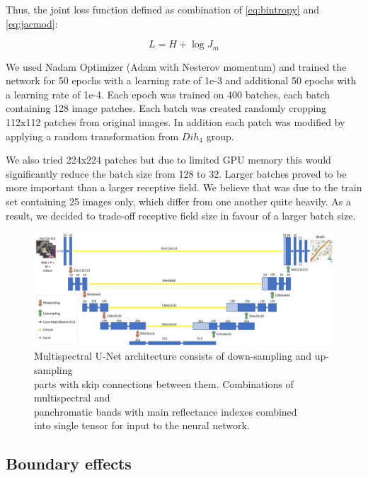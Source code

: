 \documentclass[10pt,twocolumn,letterpaper]{article}
\begin{document}
Thus, the joint loss function defined as combination of \ref{eq:bintropy} and \ref{eq:jacmod}:

\begin{equation}
L = H + \log J_{m}
\end{equation}

We used Nadam Optimizer (Adam with Nesterov momentum) \cite{nadam} and trained the network for 50 epochs with a learning rate of 1e-3 and additional 50 epochs with a learning rate of 1e-4. Each epoch was trained on 400 batches, each batch containing 128 image patches. Each batch was created randomly cropping 112x112 patches from original images. In addition each patch was modified by applying a random transformation from $Dih_4$ group.

We also tried 224x224 patches but due to limited GPU memory this would significantly reduce the batch size from 128 to 32. Larger batches proved to be more important than a larger receptive field. We believe that was due to the train set containing 25 images only, which differ from one another quite heavily. As a result, we decided to trade-off receptive field size in favour of a larger batch size.

\begin{figure}[th]
	\centering
	\includegraphics[scale=0.265]{unet}
	\captionsetup{justification=centering}
	\caption{Multispectral U-Net architecture consists of down-sampling and up-sampling \\ parts with skip connections between them.  Combinations of multispectral and \\ panchromatic bands with main reflectance indexes combined \\ into single tensor for input to the neural network. }
	\label{fig:unet}
\end{figure}

\subsection{Boundary effects}
\end{document}
